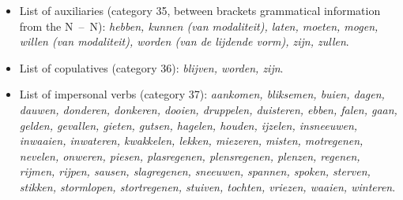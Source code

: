 \begin{itemize}
  \item List of auxiliaries (category 35, between brackets grammatical 
       information 
       from the N~--~N): {\em
hebben, kunnen (van modaliteit), laten, moeten,
mogen, willen (van modaliteit), worden (van de lijdende vorm), zijn, zullen}.

  \item List of copulatives (category 36): {\em blijven, worden, zijn}.

  \item List of impersonal verbs (category 37): 
        {\em aankomen, bliksemen, buien, dagen,
        dauwen, donderen, donkeren, dooien, druppelen, 
        duisteren, ebben, falen, gaan, gelden, 
        gevallen, gieten, gutsen, hagelen, houden, 
        ijzelen, insneeuwen, inwaaien, inwateren, kwakkelen, 
        lekken, miezeren, misten, motregenen, nevelen, 
        onweren, piesen, plasregenen, plensregenen, plenzen, 
        regenen, rijmen, rijpen, sausen, slagregenen, 
        sneeuwen, spannen, spoken, sterven, stikken, 
        stormlopen, stortregenen, stuiven, tochten, vriezen, 
        waaien, winteren}. 
\end{itemize}

 
